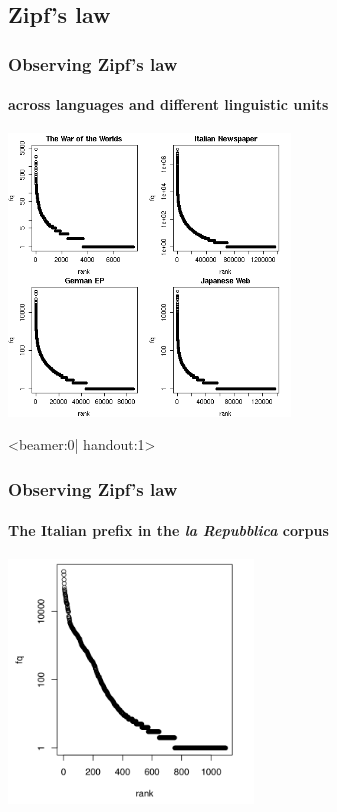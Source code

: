 \documentclass[t]{beamer} %
\begin{document}
\subsection{Zipf's law}

\begin{frame}
  \frametitle{Observing Zipf's law}
  \framesubtitle{across languages and different linguistic units}

  \ungap[1.5]
  \begin{center}
    \includegraphics[height=7.5cm]{img/othercorporarf}
  \end{center}
\end{frame}

\begin{frame}<beamer:0| handout:1>
  \frametitle{Observing Zipf's law}
  \framesubtitle{The Italian prefix  in the \emph{la Repubblica} corpus}

  \begin{center}
    \includegraphics[height=6.5cm]{img/ita-ri-rf}
  \end{center}
\end{frame}
\end{document}
